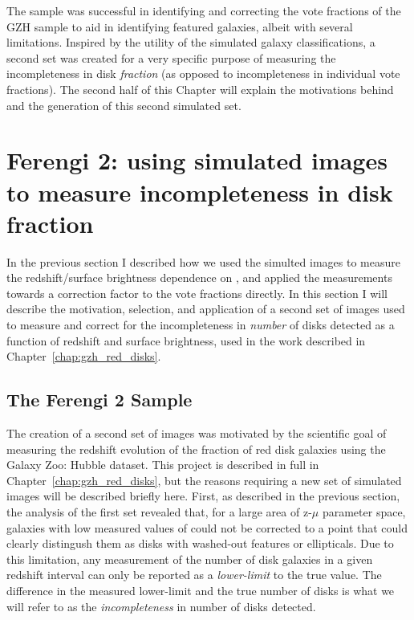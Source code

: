 The \ferengi{} sample was successful in identifying and correcting the vote fractions of the GZH sample to aid in identifying featured galaxies, albeit with several limitations. Inspired by the utility of the simulated galaxy classifications, a second set was created for a very specific purpose of measuring the incompleteness in disk \emph{fraction} (as opposed to incompleteness in individual vote fractions). The second half of this Chapter will explain the motivations behind and the generation of this second simulated set.
 
\section{Ferengi 2: using simulated images to measure incompleteness in disk fraction}

In the previous section I described how we used the simulted \ferengi{} images to measure the redshift/surface brightness dependence on \ffeatures, and applied the measurements towards a correction factor to the vote fractions directly. In this section I will describe the motivation, selection, and application of a second set of \ferengi{} images used to measure and correct for the incompleteness in \emph{number} of disks detected as a function of redshift and surface brightness, used in the work described in Chapter~\ref{chap:gzh_red_disks}.

\subsection{The Ferengi 2 Sample}
\label{ssec:ferengi2sample}

The creation of a second set of \ferengi{} images was motivated by the scientific goal of measuring the redshift evolution of the fraction of red disk galaxies using the Galaxy Zoo: Hubble dataset. This project is described in full in Chapter~\ref{chap:gzh_red_disks}, but the reasons requiring a new set of simulated images will be described briefly here. First, as described in the previous section, the analysis of the first \ferengi{} set revealed that, for a large area of z-$\mu$ parameter space, galaxies with low measured values of \ffeatures{} could not be corrected to a point that could clearly distingush them as disks with washed-out features or ellipticals. Due to this limitation, any measurement of the number of disk galaxies in a given redshift interval can only be reported as a \emph{lower-limit} to the true value. The difference in the measured lower-limit and the true number of disks is what we will refer to as the \emph{incompleteness} in number of disks detected. 

